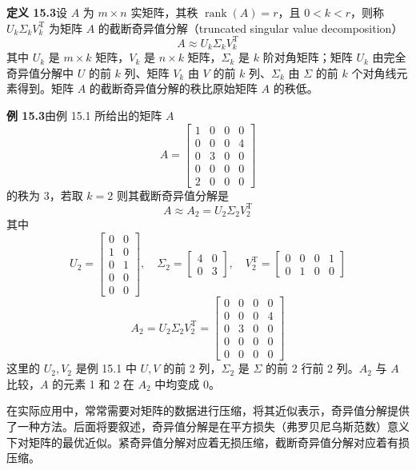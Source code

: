 \documentclass[UTF8, 12pt, fontset=fandol, oneside]{ctexart}
\begin{document}
\noindent\textbf{定义 15.3}\quad 设 $A$ 为 $m\times n$ 实矩阵，其秩 $\operatorname{rank}(A)=r$，且 $0<k<r$，则称 $U_k\Sigma_kV_k^{\mathrm{T}}$ 为矩阵 $A$ 的截断奇异值分解（truncated singular value decomposition）
\begin{equation}
A\approx U_k\Sigma_kV_k^{\mathrm{T}}
\tag{15.19}
\end{equation}
其中 $U_k$ 是 $m\times k$ 矩阵，$V_k$ 是 $n\times k$ 矩阵，$\Sigma_k$ 是 $k$ 阶对角矩阵；矩阵 $U_k$ 由完全奇异值分解中 $U$ 的前 $k$ 列、矩阵 $V_k$ 由 $V$ 的前 $k$ 列、$\Sigma_k$ 由 $\Sigma$ 的前 $k$ 个对角线元素得到。矩阵 $A$ 的截断奇异值分解的秩比原始矩阵 $A$ 的秩低。

\noindent\textbf{例 15.3}\quad 由例 15.1 所给出的矩阵 $A$
\[
A=
\begin{bmatrix}
1&0&0&0\\
0&0&0&4\\
0&3&0&0\\
0&0&0&0\\
2&0&0&0
\end{bmatrix}
\]
的秩为 3，若取 $k=2$ 则其截断奇异值分解是
\[
A\approx A_2=U_2\Sigma_2V_2^{\mathrm{T}}
\]
其中
\[
U_2=
\begin{bmatrix}
0&0\\
1&0\\
0&1\\
0&0\\
0&0
\end{bmatrix},
\quad
\Sigma_2=
\begin{bmatrix}
4&0\\
0&3
\end{bmatrix},
\quad
V_2^{\mathrm{T}}=
\begin{bmatrix}
0&0&0&1\\
0&1&0&0
\end{bmatrix}
\]
\[
A_2=U_2\Sigma_2V_2^{\mathrm{T}}=
\begin{bmatrix}
0&0&0&0\\
0&0&0&4\\
0&3&0&0\\
0&0&0&0\\
0&0&0&0
\end{bmatrix}
\]
这里的 $U_2,V_2$ 是例 15.1 中 $U,V$ 的前 2 列，$\Sigma_2$ 是 $\Sigma$ 的前 2 行前 2 列。$A_2$ 与 $A$ 比较，$A$ 的元素 1 和 2 在 $A_2$ 中均变成 0。

在实际应用中，常常需要对矩阵的数据进行压缩，将其近似表示，奇异值分解提供了一种方法。后面将要叙述，奇异值分解是在平方损失（弗罗贝尼乌斯范数）意义下对矩阵的最优近似。紧奇异值分解对应着无损压缩，截断奇异值分解对应着有损压缩。
\end{document}
